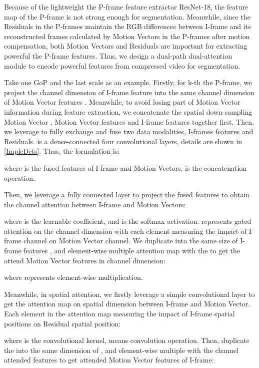 \documentclass[sigconf]{acmart}
\begin{document}
Because of the lightweight the P-frame feature extractor ResNet-18, the feature map of the P-frame is not strong enough for segmentation. Meanwhile, since the Residuals in the P-frames maintain the RGB differences between I-frame and its reconstructed frames calculated by Motion Vectors in the P-frames after motion compensation, both Motion Vectors and Residuals are important for extracting powerful the P-frame features. Thus, we design a dual-path dual-attention module to encode powerful features from compressed video for segmentation.






Take one GoP and the last scale as an example. Firstly, for k-th the P-frame, we project the channel dimension of I-frame feature  into the same channel dimension of Motion Vector features . 
Meanwhile, to avoid losing part of Motion Vector information during feature extraction, we concatenate the spatial down-sampling Motion Vector , Motion Vector features  and I-frame features  together first.
Then, we leverage  to fully exchange and fuse two data modalities, I-frames features and Residuals.  is a dense-connected four convolutional layers, details are shown in \ref{ImpleDets}. Thus, the formulation is:

where  is the fused features of I-frame and Motion Vectors,  is the concatenation operation.


Then, we leverage a fully connected layer to project the fused features to obtain the channel attention between I-frame and Motion Vectors:

where  is the learnable coefficient, and  is the softmax activation.  represents gated attention on the channel dimension with each element measuring the impact of I-frame channel on Motion Vector channel.
We duplicate  into the same size of I-frame features , and element-wise multiple attention map with the  to get the attend Motion Vector features  in channel dimension:

where  represents element-wise multiplication.

Meanwhile, in spatial attention, we firstly leverage a simple convolutional layer to get the attention map  on spatial dimension between I-frame and Motion Vector. Each element in the attention map measuring the impact of I-frame spatial positions on Residual spatial position:

where  is the convolutional kernel,  means convolution operation. 
Then, duplicate the  into the same dimension of , and element-wise multiple with the channel attended features to get attended Motion Vector features of I-frame:
\end{document}
